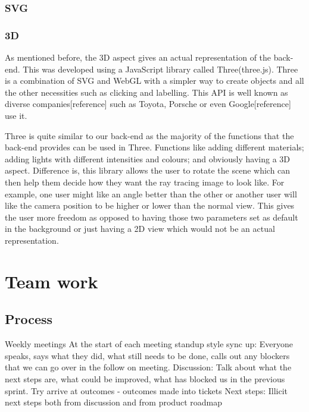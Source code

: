 \documentclass[a4paper]{report}
\begin{document}
	
	\subsection{SVG}
	
	
	\subsection{3D}
	As mentioned before, the 3D aspect gives an actual representation of the back-end. This was developed using a JavaScript library called Three(three.js). Three is a combination of SVG and WebGL with a simpler way to create objects and all the other necessities such as clicking and labelling. This API is well known as diverse companies[reference] such as Toyota, Porsche or even Google[reference] use it. 
	
	Three is quite similar to our back-end as the majority of the functions that the back-end provides can be used in Three. Functions like adding different materials; adding lights with different intensities and colours; and obviously having a 3D aspect. Difference is, this library allows the user to rotate the scene which can then help them decide how they want the ray tracing image to look like. For example, one user might like an angle better than the other or another user will like the camera position to be higher or lower than the normal view. This gives the user more freedom as opposed to having those two parameters set as default in the background or just having a 2D view which would not be an actual representation. 
	
	
	\chapter{Team work} 
	
	
	\section{Process}
	Weekly meetings
	At the start of each meeting standup style sync up:
	Everyone speaks, says what they did, what still needs to be done, calls out any blockers that we can go over in the follow on meeting.
	Discussion: 
	Talk about what the next steps are, what could be improved, what has blocked us in the previous sprint. Try arrive at outcomes - outcomes made into tickets
	Next steps:
	Illicit next steps both from discussion and from product roadmap
	
\end{document}
